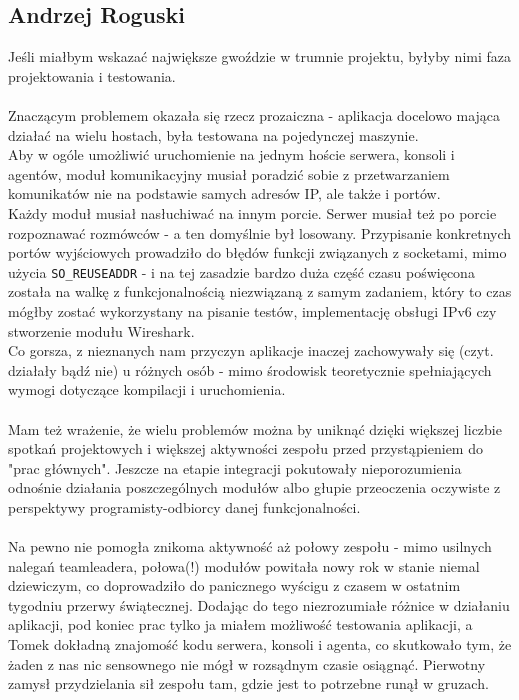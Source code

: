 \documentclass[10pt,a4paper]{article}
\begin{document}
        \subsection{Andrzej Roguski}
            Jeśli miałbym wskazać największe gwoździe w trumnie projektu, byłyby nimi faza projektowania i testowania. \\
            \\
            Znaczącym problemem okazała się rzecz prozaiczna - aplikacja docelowo mająca działać na wielu hostach, była testowana na pojedynczej maszynie. \\
            Aby w ogóle umożliwić uruchomienie na jednym hoście serwera, konsoli i agentów, moduł komunikacyjny musiał poradzić sobie z przetwarzaniem komunikatów nie na podstawie samych adresów IP, ale także i portów. \\
            Każdy moduł musiał nasłuchiwać na innym porcie. Serwer musiał też po porcie rozpoznawać rozmówców - a ten domyślnie był losowany. Przypisanie konkretnych portów wyjściowych prowadziło do błędów funkcji związanych z socketami, mimo użycia \texttt{SO\_REUSEADDR} - i na tej zasadzie bardzo duża część czasu poświęcona została na walkę z funkcjonalnością niezwiązaną z samym zadaniem, który to czas mógłby zostać wykorzystany na pisanie testów, implementację obsługi IPv6 czy stworzenie modułu Wireshark. \\
            Co gorsza, z nieznanych nam przyczyn aplikacje inaczej zachowywały się (czyt. działały bądź nie) u różnych osób - mimo środowisk teoretycznie spełniających wymogi dotyczące kompilacji i uruchomienia. \\
            \\
            Mam też wrażenie, że wielu problemów można by uniknąć dzięki większej liczbie spotkań projektowych i większej aktywności zespołu przed przystąpieniem do "prac głównych". Jeszcze na etapie integracji pokutowały nieporozumienia odnośnie działania poszczególnych modułów albo głupie przeoczenia oczywiste z perspektywy programisty-odbiorcy danej funkcjonalności. \\
            \\
            Na pewno nie pomogła znikoma aktywność aż połowy zespołu - mimo usilnych nalegań teamleadera, połowa(!) modułów powitała nowy rok w stanie niemal dziewiczym, co doprowadziło do panicznego wyścigu z czasem w ostatnim tygodniu przerwy świątecznej. Dodając do tego niezrozumiałe różnice w działaniu aplikacji, pod koniec prac tylko ja miałem możliwość testowania aplikacji, a Tomek dokładną znajomość kodu serwera, konsoli i agenta, co skutkowało tym, że żaden z nas nic sensownego nie mógł w rozsądnym czasie osiągnąć. Pierwotny zamysł przydzielania sił zespołu tam, gdzie jest to potrzebne runął w gruzach.
\end{document}
